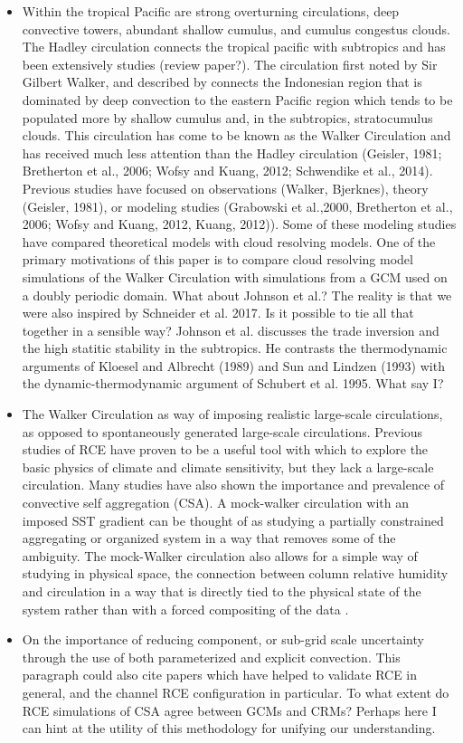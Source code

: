 \documentclass[draft]{agujournal2019}
\begin{document}
\begin{itemize}
  \item{Within the tropical Pacific are strong overturning circulations, deep convective towers, abundant shallow cumulus, 
  and cumulus congestus clouds.  The Hadley circulation connects the tropical pacific with subtropics and has been 
  extensively studies (review paper?).  The circulation first 
  noted by Sir Gilbert Walker, and described by  connects the Indonesian region that is dominated 
  by deep convection to the eastern Pacific region which tends to be populated more by shallow cumulus and, in the 
  subtropics, stratocumulus clouds.  This circulation has come to be 
  known as the Walker Circulation and has received much less attention than the Hadley circulation (Geisler, 1981; 
  Bretherton et al., 2006; Wofsy and Kuang, 2012; Schwendike et al., 2014).  Previous studies have focused on 
  observations (Walker, Bjerknes), theory (Geisler, 1981), 
  or modeling studies (Grabowski et al.,2000, Bretherton et al., 2006; Wofsy and Kuang, 2012, Kuang, 2012)).  Some of these 
  modeling studies have compared theoretical models with cloud
  resolving models.  One of the primary motivations of this paper is to compare cloud resolving model simulations of the Walker    
  Circulation with simulations from a GCM used on a doubly periodic domain.    What about Johnson et al.?}
  The reality is that we were also inspired by Schneider et al. 2017.  Is it possible to tie all that together in a sensible way?  
 Johnson et al. discusses the trade inversion and the high statitic stability in the subtropics.  He contrasts 
 the thermodynamic arguments of Kloesel and Albrecht (1989) 
  and Sun and Lindzen (1993) with the dynamic-thermodynamic argument of Schubert et al. 1995.  What say I?
  \item{The Walker Circulation as way of imposing realistic large-scale circulations, as opposed to spontaneously generated large-scale
  circulations.  Previous studies of RCE have proven to be a 
  useful tool with which to explore the basic physics of climate and climate sensitivity, but they lack a large-scale circulation.  Many 
  studies have also shown the importance and prevalence of convective self aggregation (CSA).  A mock-walker circulation with an
  imposed SST gradient can be thought of as studying a partially constrained aggregating or organized system in a way that removes
  some of the ambiguity.  The mock-Walker circulation also allows for a simple way of studying in physical space, the connection
  between column relative humidity and circulation in a way that is directly tied to the physical state of the system rather than with
  a forced compositing of the data  
  \cite{Bretherton2005, Muller2012}.}
  \item{On the importance of reducing component, or sub-grid scale uncertainty through the use of both parameterized and explicit 
  convection.  This paragraph could also cite papers which have helped to validate RCE in general, and the channel RCE configuration
  in particular.  To what extent do RCE simulations of CSA agree between GCMs and CRMs?  Perhaps here I can hint at the utility of 
  this methodology for unifying our understanding.}
\end{itemize}
\end{document}
